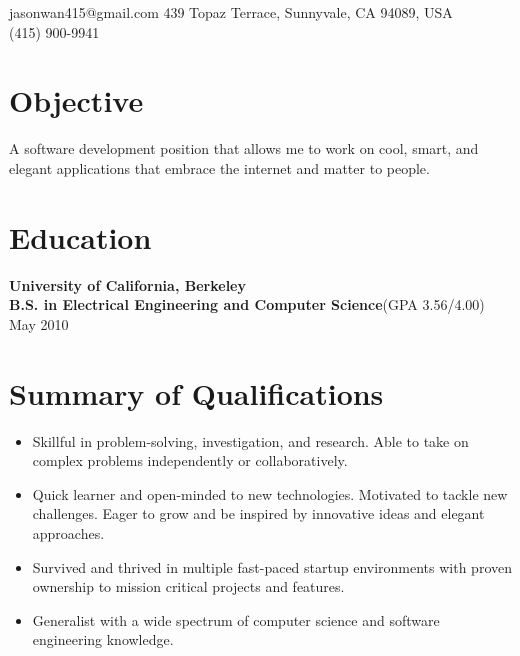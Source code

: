 \documentclass[margin,line]{res}
\newcommand{\sstyle}{\sc}
\begin{document}
\begin{resume}
  {\small
  \vspace*{-.1in}
  \hspace*{-1.3in}jasonwan415@gmail.com \hfill 439 Topaz Terrace, Sunnyvale, CA 94089, USA\\
  \hspace*{-1.3in}\hfill (415) 900-9941}

  \vspace*{-.1in}
  \section{\sstyle Objective}
  A software development position that allows me to work on cool, smart, and
  elegant applications that embrace the internet and matter to people.

  \section{\sstyle Education}
  {\bf University of California, Berkeley}\\
  {\bf B.S. in Electrical Engineering and Computer Science}\hspace{.1in}(GPA 3.56/4.00) \hfill May 2010

  \section{\sstyle Summary of Qualifications}
  \begin{itemize}
  \item Skillful in problem-solving, investigation, and research.
        Able to take on complex problems independently or collaboratively.
  \item Quick learner and open-minded to new technologies. Motivated to tackle
        new challenges. Eager to grow and be inspired by innovative ideas and
        elegant approaches.
  \item Survived and thrived in multiple fast-paced startup environments with
        proven ownership to mission critical projects and features.
  \item Generalist with a wide spectrum of computer science and software
        engineering knowledge.
  \end{itemize}


\end{resume}
\end{document}
